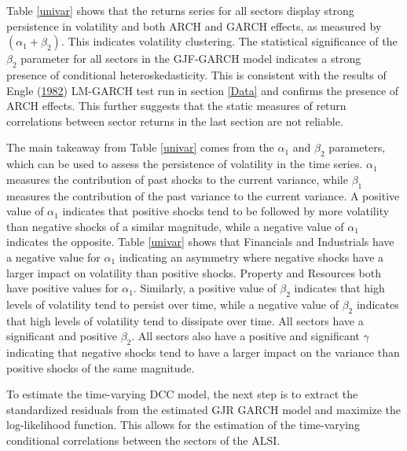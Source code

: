 \documentclass[11pt,preprint, authoryear]{elsarticle}
\numberwithin{equation}{section}
\numberwithin{figure}{section}
\numberwithin{table}{section}
\begin{document}
Table \ref{univar} shows that the returns series for all sectors display
strong persistence in volatility and both ARCH and GARCH effects, as
measured by \((\alpha_1 + \beta_2 )\). This indicates volatility
clustering. The statistical significance of the \(\beta_2\) parameter
for all sectors in the GJF-GARCH model indicates a strong presence of
conditional heteroskedasticity. This is consistent with the results of
Engle (\protect\hyperlink{ref-engle}{1982}) LM-GARCH test run in section
\ref{Data} and confirms the presence of ARCH effects. This further
suggests that the static measures of return correlations between sector
returns in the last section are not reliable.

The main takeaway from Table \ref{univar} comes from the \(\alpha_1\)
and \(\beta_2\) parameters, which can be used to assess the persistence
of volatility in the time series. \(\alpha_1\) measures the contribution
of past shocks to the current variance, while \(\beta_1\) measures the
contribution of the past variance to the current variance. A positive
value of \(\alpha_1\) indicates that positive shocks tend to be followed
by more volatility than negative shocks of a similar magnitude, while a
negative value of \(\alpha_1\) indicates the opposite. Table
\ref{univar} shows that Financials and Industrials have a negative value
for \(\alpha_1\) indicating an asymmetry where negative shocks have a
larger impact on volatility than positive shocks. Property and Resources
both have positive values for \(\alpha_1\). Similarly, a positive value
of \(\beta_2\) indicates that high levels of volatility tend to persist
over time, while a negative value of \(\beta_2\) indicates that high
levels of volatility tend to dissipate over time. All sectors have a
significant and positive \(\beta_2\). All sectors also have a positive
and significant \(\gamma\) indicating that negative shocks tend to have
a larger impact on the variance than positive shocks of the same
magnitude.

To estimate the time-varying DCC model, the next step is to extract the
standardized residuals from the estimated GJR GARCH model and maximize
the log-likelihood function. This allows for the estimation of the
time-varying conditional correlations between the sectors of the ALSI.
\end{document}
